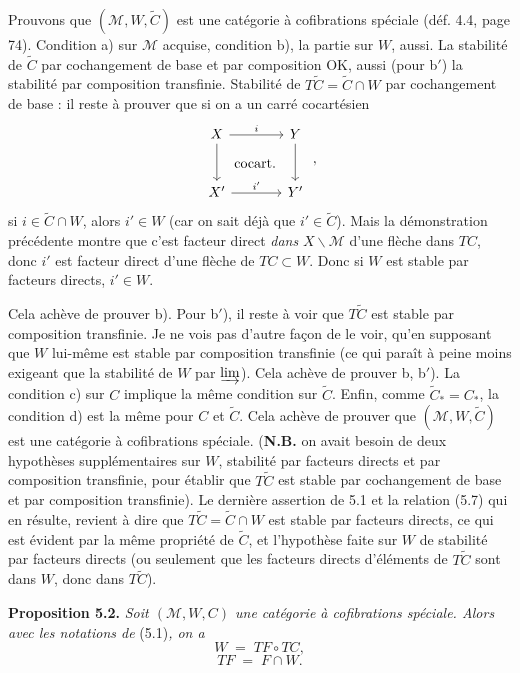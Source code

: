 Prouvons que $(\mathcal{M}, W, \tilde{C})$ est une catégorie à cofibrations spéciale (déf. 4.4, page 74). Condition a) sur $\mathcal{M}$ acquise, condition b), la partie sur $W$, aussi. La stabilité de $\tilde{C}$ par cochangement de base et par composition OK, aussi (pour b$'$) la stabilité par composition transfinie. Stabilité de $T\tilde{C} = \tilde{C} \cap W$ par cochangement de base : il reste à prouver que si on a un carré cocartésien
\[
\begin{tikzcd}[row sep=large, column sep=large]
X \arrow[r, "i"] \arrow[d] \arrow[dr, phantom, "\text{cocart.}"] & Y \arrow[d] \\
X' \arrow[r, "i'"] & Y'
\end{tikzcd} \; ,
\]
si $i \in \tilde{C}\cap W$, alors $i' \in W$ (car on sait déjà que $i' \in \tilde{C}$). Mais la démonstration précédente montre que c'est facteur direct \textit{dans} $X\backslash\mathcal{M}$ d'une flèche dans $TC$, donc $i'$ est facteur direct d'une flèche de $TC \subset W$. Donc si $W$ est stable par facteurs directs, $i' \in W$.


Cela achève de prouver b). Pour b$'$), il reste à voir que $T\tilde{C}$ est stable par composition transfinie. Je ne vois pas d'autre façon de le voir, qu'en supposant que $W$ lui-même est stable par composition transfinie (ce qui paraît à peine moins exigeant que la stabilité de $W$ par $\varinjlim$). Cela achève de prouver b, b$'$). La condition c) sur $C$ implique la même condition sur $\tilde{C}$. Enfin, comme $\tilde{C}_{*} = C_{*}$, la condition d) est la même pour $C$ et $\tilde{C}$. Cela achève de prouver que $(\mathcal{M}, W, \tilde{C})$ est une catégorie à cofibrations spéciale. (\textbf{N.B.} on avait besoin de deux hypothèses supplémentaires sur $W$, stabilité par facteurs directs et par composition transfinie, pour établir que $T\tilde{C}$ est stable par cochangement de base et par composition transfinie). Le dernière assertion de 5.1 et la relation (5.7) qui en résulte, revient à dire que $T\tilde{C} = \tilde{C} \cap W$ est stable par facteurs directs, ce qui est évident par la même propriété de $\tilde{C}$, et l'hypothèse faite sur $W$ de stabilité par facteurs directs (ou seulement que les facteurs directs d'éléments de $T\tilde{C}$ sont dans $W$, donc dans $T\tilde{C}$). %


\textbf{Proposition 5.2.} \textit{Soit $(\mathcal{M}, W, C)$ une catégorie à cofibrations spéciale. Alors avec les notations de} (5.1)\textit{, on a}
\[
W \;=\; TF \circ TC,
\tag*{(5.8)}
\]
\[
TF \;=\; F \cap W.
\tag*{(5.9)}
\]

